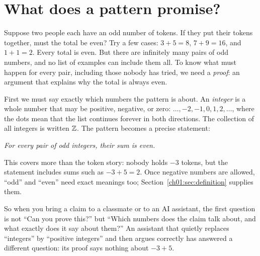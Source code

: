 \section{What does a pattern promise?}\label{ch01:sec:pattern}
Suppose two people each have an odd number of tokens. If they put their tokens together, must the total be even? Try a few cases: $3+5=8$, $7+9=16$, and $1+1=2$. Every total is even. But there are infinitely many pairs of odd numbers, and no list of examples can include them all. To know what must happen for every pair, including those nobody has tried, we need a \emph{proof}: an argument that explains why the total is always even.

First we must say exactly which numbers the pattern is about. An \emph{integer} is a whole number that may be positive, negative, or zero: $\ldots,-2,-1,0,1,2,\ldots$, where the dots mean that the list continues forever in both directions. The collection of all integers is written $\mathbb Z$. The pattern becomes a precise statement:
\begin{center}
\emph{For every pair of odd integers, their sum is even.}
\end{center}
This covers more than the token story: nobody holds $-3$ tokens, but the statement includes sums such as $-3+5=2$. Once negative numbers are allowed, ``odd'' and ``even'' need exact meanings too; Section~\ref{ch01:sec:definition} supplies them.

So when you bring a claim to a classmate or to an AI assistant, the first question is not ``Can you prove this?'' but ``Which numbers does the claim talk about, and what exactly does it say about them?'' An assistant that quietly replaces ``integers'' by ``positive integers'' and then argues correctly has answered a different question: its proof says nothing about $-3+5$.
